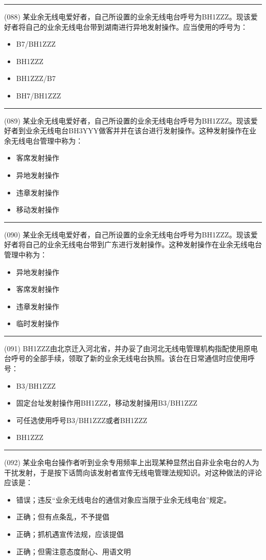 \documentclass[twocolumn]{ctexart}  %
\begin{document}
\noindent\rule{0.5\textwidth}{1pt}
\heiti (088) 某业余无线电爱好者，自己所设置的业余无线电台呼号为BH1ZZZ。现该爱好者将自己的业余无线电台带到湖南进行异地发射操作。应当使用的呼号为： \songti {\color{gray} [LK0086] }
\begin{itemize}
	\item  B7/BH1ZZZ
	\item  BH1ZZZ
	\item  BH1ZZZ/B7
	\item  BH7/BH1ZZZ
\end{itemize}


\noindent\rule{0.5\textwidth}{1pt}
\heiti (089) 某业余无线电爱好者，自己所设置的业余无线电台呼号为BH1ZZZ。现该爱好者到业余无线电台BH3YYY做客并并在该台进行发射操作。这种发射操作在业余无线电台管理中称为： \songti {\color{gray} [LK0087] }
\begin{itemize}
	\item  客席发射操作
	\item  异地发射操作
	\item  违章发射操作
	\item  移动发射操作
\end{itemize}


\noindent\rule{0.5\textwidth}{1pt}
\heiti (090) 某业余无线电爱好者，自己所设置的业余无线电台呼号为BH1ZZZ。现该爱好者将自己的业余无线电台带到广东进行发射操作。这种发射操作在业余无线电台管理中称为： \songti {\color{gray} [LK0088] }
\begin{itemize}
	\item  异地发射操作
	\item  客席发射操作
	\item  违章发射操作
	\item  临时发射操作
\end{itemize}


\noindent\rule{0.5\textwidth}{1pt}
\heiti (091) BH1ZZZ由北京迁入河北省，并办妥了由河北无线电管理机构指配使用原电台呼号的全部手续，领取了新的业余无线电台执照。该台在日常通信时应使用呼号： \songti {\color{gray} [LK0093] }
\begin{itemize}
	\item  B3/BH1ZZZ
	\item  固定台址发射操作用BH1ZZZ，移动发射操用B3/BH1ZZZ
	\item  可任选使用呼号B3/BH1ZZZ或者BH1ZZZ
	\item  BH1ZZZ
\end{itemize}


\noindent\rule{0.5\textwidth}{1pt}
\heiti (092) 某业余电台操作者听到业余专用频率上出现某种显然出自非业余电台的人为干扰发射，于是按下话筒向该发射者宣传无线电管理法规知识。对这种做法的评论应该是： \songti {\color{gray} [LK0056] }
\begin{itemize}
	\item  错误；违反“业余无线电台的通信对象应当限于业余无线电台”规定。
	\item  正确；但有点条乱，不予提倡
	\item  正确；抓机遇宣传法规，应该提倡
	\item  正确；但需注意态度耐心、用语文明
\end{itemize}
\end{document}

